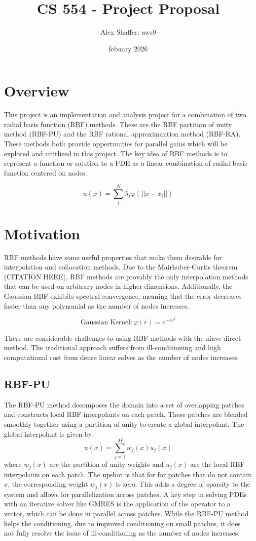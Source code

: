 \documentclass{article}
\title{CS 554 - Project Proposal}
\author{Alex Shaffer: aws9 }
\date{febuary 2026}
\begin{document}
\maketitle

\section*{Overview}
This project is an implementation and analysis project for a combination of two radial basis function (RBF) methods. 
These are the RBF partition of unity method (RBF-PU) and the RBF rational approximantion method (RBF-RA). 
These methods both provide oppertunities for parallel gains which will be explored and unitlized in this project.
The key idea of RBF methods is to represent a function or solution to a PDE as a linear combination of radial basis function centered on nodes.

\[
u(x) = \sum_i^N \lambda_i \varphi(||x-x_i||)
\]

\section*{Motivation}
RBF methods have some useful properties that make them desirable for interpolation and collocation methods.
Due to the Mairhuber-Curtis theorem (CITATION HERE), RBF methods are provably the only interpolation methods that can be used on arbitrary nodes in higher dimensions.
Additionally, the Gaussian RBF exhibits spectral convergence, meaning that the error decreases faster than any polynomial as the number of nodes increases.

\[
\text{Gaussian Kernel}: \varphi(r) = e^{-\epsilon r^2}
\]

There are considerable challenges to using RBF methods with the niave direct method.
The traditional approach suffers from ill-conditioning and high computational cost from dense linear solves as the number of nodes increases.

\subsection*{RBF-PU}
The RBF-PU method decomposes the domain into a set of overlapping patches and constructs local RBF interpolants on each patch. 
These patches are blended smoothly together using a partition of unity to create a global interpolant.
The global interpolant is given by:
\[
u(x) = \sum_{j=1}^M w_j(x) u_j(x)
\]
where $w_j(x)$ are the partition of unity weights and $u_j(x)$ are the local RBF interpolants on each patch.
The upshot is that for for patches that do not contain $x$, the corresponding weight $w_j(x)$ is zero. 
This adds a degree of sparsity to the system and allows for parallelization across patches.
A key step in solving PDEs with an iterative solver like GMRES is the application of the operator to a vector, which can be done in parallel across patches.
While the RBF-PU method helps the conditioning, due to improved conditioning on small patches, it does not fully resolve the issue of ill-conditioning as the number of nodes increases.
\end{document}
